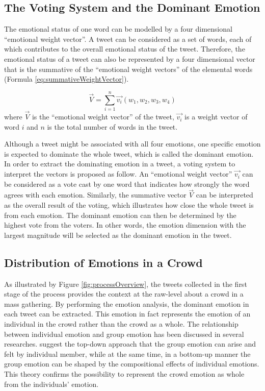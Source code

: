 \subsection{The Voting System and the Dominant Emotion}
The emotional status of one word can be modelled by a four dimensional ``emotional weight vector''. A tweet can be considered as a set of words, each of which contributes to the overall emotional status of the tweet. Therefore, the emotional status of a tweet can also be represented by a four dimensional vector that is the summative of the ``emotional weight vectors'' of the elemental words (Formula \ref{eq:summativeWeightVector}).

\begin{equation}
\label{eq:summativeWeightVector}
	\vec{V} = \sum_{i=1}^{n} \vec{v_i}(w_1, w_2, w_3, w_4)
\end{equation}
where \(\vec{V}\) is the ``emotional weight vector'' of the tweet, \(\vec{v_i}\) is a weight vector of word \(i\) and \(n\) is the total number of words in the tweet.

Although a tweet might be associated with all four emotions, one specific emotion is expected to dominate the whole tweet, which is called the dominant emotion. In order to extract the dominating emotion in a tweet, a voting system to interpret the vectors is proposed as follow. An ``emotional weight vector'' \(\vec{v_i}\) can be considered as a vote cast by one word that indicates how strongly the word agrees with each emotion. Similarly, the summative vector \(\vec{V}\) can be interpreted as the overall result of the voting, which illustrates how close the whole tweet is from each emotion. The dominant emotion can then be determined by the highest vote from the voters. In other words, the emotion dimension with the largest magnitude will be selected as the dominant emotion in the tweet.

\subsection{Distribution of Emotions in a Crowd}
As illustrated by Figure \ref{fig:processOverview}, the tweets collected in the first stage of the process provides the context at the raw-level about a crowd in a mass gathering. By performing the emotion analysis, the dominant emotion in each tweet can be extracted. This emotion in fact represents the emotion of an individual in the crowd rather than the crowd as a whole. The relationship between individual emotion and group emotion has been discussed in several researches. \citet{barsade1998group} suggest the top-down approach that the group emotion can arise and felt by individual member, while at the same time, in a bottom-up manner the group emotion can be shaped by the compositional effects of individual emotions. This theory confirms the possibility to represent the crowd emotion as whole from the individuals' emotion.

